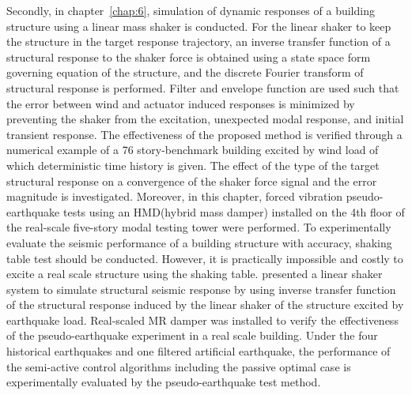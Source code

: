 Secondly, in chapter~\ref{chap:6}, simulation of dynamic responses of a building structure using a linear mass shaker is conducted. For the linear shaker to keep the structure in the target response trajectory, an inverse transfer function of a structural response to the shaker force is obtained using a state space form governing equation of the structure, and the discrete Fourier transform of structural response is performed. Filter and envelope function are used such that the error between wind and actuator induced responses is minimized by preventing the shaker from the excitation, unexpected modal response, and initial transient response. The effectiveness of the proposed method is verified through a numerical example of a 76 story-benchmark building excited by wind load of which deterministic time history is given. The effect of the type of the target structural response on a convergence of the shaker force signal and the error magnitude is investigated. Moreover, in this chapter, forced vibration pseudo-earthquake tests using an HMD(hybrid mass damper) installed on the 4th floor of the real-scale five-story modal testing tower were performed. To experimentally evaluate the seismic performance of a building structure with accuracy, shaking table test should be conducted. However, it is practically impossible and costly to excite a real scale structure using the shaking table. \citet{yu2005forced} presented a linear shaker system to simulate structural seismic response by using inverse transfer function of the structural response induced by the linear shaker of the structure excited by earthquake load. Real-scaled MR damper was installed to verify the effectiveness of the pseudo-earthquake experiment in a real scale building. Under the four historical earthquakes and one filtered artificial earthquake, the performance of the semi-active control algorithms including the passive optimal case is experimentally evaluated by the pseudo-earthquake test method.

